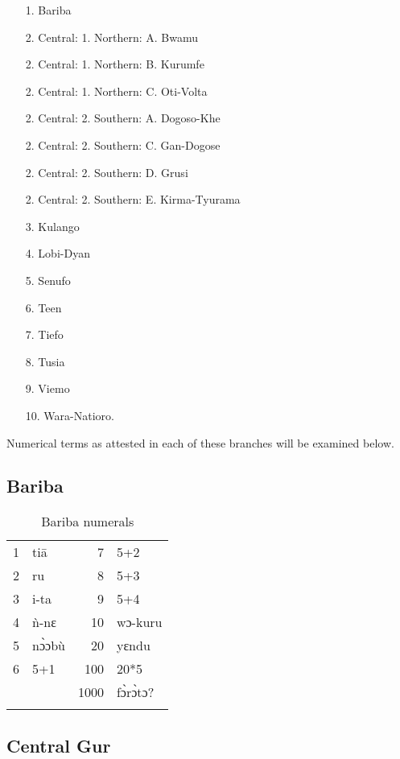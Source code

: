 \begin{itemize} 
\item[1.]Bariba
\item[2.]Central: 1. Northern: A. Bwamu
\item[2.]Central: 1. Northern: B. Kurumfe
\item[2.]Central: 1. Northern: C. Oti-Volta
\item[2.]Central: 2. Southern: A. Dogoso-Khe
\item[2.]Central: 2. Southern: C. Gan-Dogose
\item[2.]Central: 2. Southern: D. Grusi
\item[2.]Central: 2. Southern: E. Kirma-Tyurama
\item[3.]Kulango
\item[4.]Lobi-Dyan
\item[5.]Senufo
\item[6.]Teen
\item[7.]Tiefo
\item[8.]Tusia
\item[9.]Viemo
\item[10.] Wara-Natioro.
\end{itemize}

Numerical terms as attested in each of these branches will be examined below.

 
\subsection{Bariba}%
\begin{table}
\caption{\label{tab:3:163}Bariba numerals}
\begin{tabularx}{\textwidth}{lXrl}
\lsptoprule
{1} & tiā & {7} & 5+2\\
{2} & ru & {8} & 5+3\\
{3} & i-ta & {9} & 5+4\\
{4} & {\`{n}}-nɛ & {10} & wɔ-kuru\\
{5} & n{\`{ɔ}}ɔb{\`{u}} & {20} & yɛndu\\
{6} & 5+1 & {100} & 20*5\\
&  & {1000} & f{\`{ɔ}}r{\`{ɔ}}tɔ? \\
\lspbottomrule
\end{tabularx}
\end{table}


\subsection{Central Gur}%
